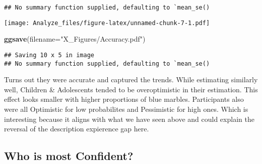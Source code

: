 \documentclass[]{article}
\newenvironment{Shaded}{\begin{snugshade}}{\end{snugshade}}
\newcommand{\KeywordTok}[1]{\textcolor[rgb]{0.13,0.29,0.53}{\textbf{#1}}}
\newcommand{\DataTypeTok}[1]{\textcolor[rgb]{0.13,0.29,0.53}{#1}}
\newcommand{\StringTok}[1]{\textcolor[rgb]{0.31,0.60,0.02}{#1}}
\newcommand{\NormalTok}[1]{#1}
\begin{document}
\begin{verbatim}
## No summary function supplied, defaulting to `mean_se()
\end{verbatim}

\texttt{[image: Analyze\_files/figure-latex/unnamed-chunk-7-1.pdf]}

\begin{Shaded}
\begin{Highlighting}[]
\KeywordTok{ggsave}\NormalTok{(}\DataTypeTok{filename=}\StringTok{"X_Figures/Accuracy.pdf"}\NormalTok{)}
\end{Highlighting}
\end{Shaded}

\begin{verbatim}
## Saving 10 x 5 in image
## No summary function supplied, defaulting to `mean_se()
\end{verbatim}

Turns out they were accurate and captured the trends. While estimating
similarly well, Children \& Adolescents tended to be overoptimistic in
their estimation. This effect looks smaller with higher proportions of
blue marbles. Participants also were all Optimistic for low probabilites
and Pessimistic for high ones. Which is interesting because it aligns
with what we have seen above and could explain the reversal of the
description expierence gap here.

\subsection{Who is most Confident?}\label{who-is-most-confident}
\end{document}

